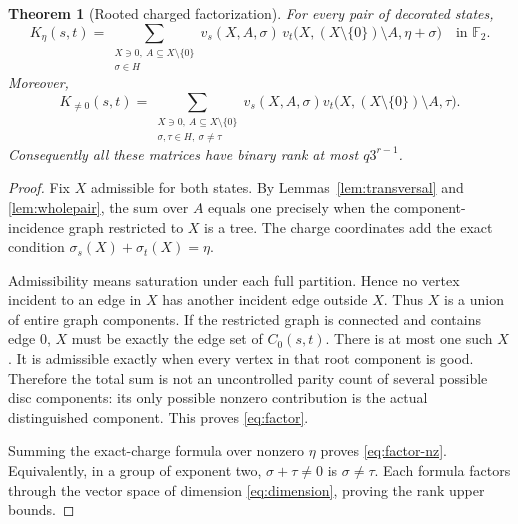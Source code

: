 \documentclass[11pt,letterpaper]{article}
\newtheorem{theorem}{Theorem}[section]
\theoremstyle{definition}
\newcommand{\F}{\mathbb F}
\begin{document}
\begin{theorem}[Rooted charged factorization]\label{thm:factor}
For every pair of decorated states,
\begin{equation}
 K_\eta(s,t)=\sum_{\substack{X\ni0,\ A\subseteq X\setminus\{0\}\\\sigma\in H}}
 v_s(X,A,\sigma)\,
 v_t\bigl(X,(X\setminus\{0\})\setminus A,\eta+\sigma\bigr)
 \quad\text{in }\F_2.\label{eq:factor}
\end{equation}
Moreover,
\begin{equation}
 K_{\ne0}(s,t)=\sum_{\substack{X\ni0,\ A\subseteq X\setminus\{0\}\\\sigma,\tau\in H,\ \sigma\ne\tau}}
 v_s(X,A,\sigma)v_t\bigl(X,(X\setminus\{0\})\setminus A,\tau\bigr).
 \label{eq:factor-nz}
\end{equation}
Consequently all these matrices have binary rank at most $q3^{r-1}$.
\end{theorem}
\begin{proof}
Fix $X$ admissible for both states. By Lemmas~\ref{lem:transversal} and \ref{lem:wholepair}, the sum over $A$ equals one precisely when the component-incidence graph restricted to $X$ is a tree. The charge coordinates add the exact condition $\sigma_s(X)+\sigma_t(X)=\eta$.

Admissibility means saturation under each full partition. Hence no vertex incident to an edge in $X$ has another incident edge outside $X$. Thus $X$ is a union of entire graph components. If the restricted graph is connected and contains edge $0$, $X$ must be exactly the edge set of $C_0(s,t)$. There is at most one such $X$. It is admissible exactly when every vertex in that root component is good. Therefore the total sum is not an uncontrolled parity count of several possible disc components: its only possible nonzero contribution is the actual distinguished component. This proves \eqref{eq:factor}.

Summing the exact-charge formula over nonzero $\eta$ proves \eqref{eq:factor-nz}. Equivalently, in a group of exponent two, $\sigma+\tau\ne0$ is $\sigma\ne\tau$. Each formula factors through the vector space of dimension \eqref{eq:dimension}, proving the rank upper bounds.
\end{proof}
\end{document}
